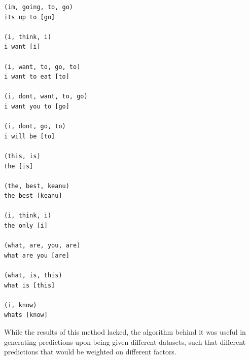 \documentclass{article}
\begin{document}
\begin{multicols}{3}
\begin{Verbatim}[fontsize=\footnotesize]
(im, going, to, go)
its up to [go]

(i, think, i)
i want [i]

(i, want, to, go, to)
i want to eat [to]

(i, dont, want, to, go)
i want you to [go]

(i, dont, go, to)
i will be [to]

(this, is)
the [is]

(the, best, keanu)
the best [keanu]

(i, think, i)
the only [i]

(what, are, you, are)
what are you [are]

(what, is, this)
what is [this]

(i, know)
whats [know]

\end{Verbatim}
\end{multicols}

While the results of this method lacked, the algorithm behind it was useful in
generating predictions upon being given different datasets, such that different
predictions that would be weighted on different factors.
\end{document}
